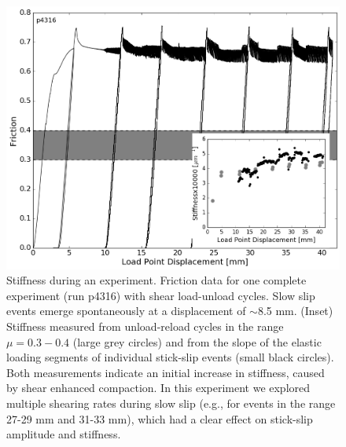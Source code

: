 \begin{figure}
	\centering
		\includegraphics[scale=0.5]{chap_lab_slow_eq/Figure_S1.png}
   	\caption{Stiffness during an experiment. Friction data for one complete experiment (run p4316) with shear load-unload cycles. Slow slip events emerge spontaneously at a displacement of $\sim$8.5 mm. (Inset) Stiffness measured from unload-reload cycles in the range $\mu=0.3-0.4$ (large grey circles) and from the slope of the elastic loading segments of individual stick-slip events (small black circles). Both measurements indicate an initial increase in stiffness, caused by shear enhanced compaction. In this experiment we explored multiple shearing rates during slow slip (e.g., for events in the range 27-29 mm and 31-33 mm), which had a clear effect on stick-slip amplitude and stiffness.}
  	\label{Figure_S1}
\end{figure}

